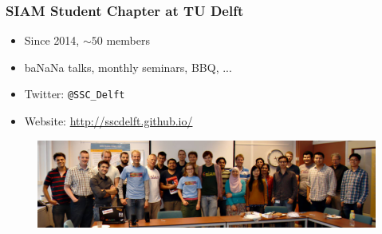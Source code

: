 \documentclass{beamer}
\begin{document}
\begin{frame}
\begin{tikzpicture}[overlay]
\end{tikzpicture}
\end{frame}

\begin{frame}
 \frametitle{SIAM Student Chapter at TU Delft}
 \begin{itemize}
  \item Since 2014, $\sim \! 50$ members
  \item ba{\color{red}NaN}a talks, monthly seminars, BBQ, ...
  \item Twitter: \texttt{@SSC\_Delft}
  \item Website: \href{http://sscdelft.github.io/}{http://sscdelft.github.io/}
 \end{itemize}

   \begin{figure}[h]
  \includegraphics[width=\textwidth]{pics/ssc_delft.png}
  \end{figure}
\end{frame}
\end{document}
